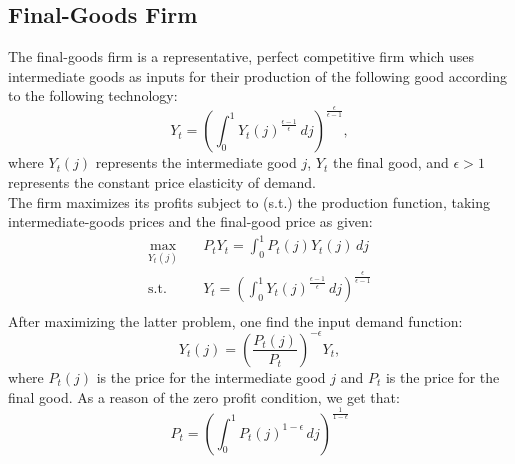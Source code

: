 \documentclass[11pt, a4paper, leqno]{article}
\begin{document}
\subsection{Final-Goods Firm}
The final-goods firm is a representative, perfect competitive firm which uses intermediate goods as inputs for their production of the following good according to the following technology:
\begin{equation}
	Y_{t} = \left( \int_{0}^{1} Y_{t}(j)^{\frac{\epsilon -1}{\epsilon}} \,dj \right)^{\frac{\epsilon}{\epsilon -1}},
\end{equation}
where $Y_{t}(j)$ represents the intermediate good $j$, $Y_{t}$ the final good, and $\epsilon >1$ represents the constant price elasticity of demand.\\
The firm maximizes its profits subject to (s.t.) the production function, taking intermediate-goods prices and the final-good price as given:
\begin{equation*}
	\begin{aligned}
		\max_{Y_{t}(j)} \quad & P_{t}Y_{t} = \int_{0}^{1} P_{t}(j)Y_{t}(j) \,dj\\
		\textrm{s.t.} \quad & Y_{t} = \left( \int_{0}^{1} Y_{t}(j)^{\frac{\epsilon -1}{\epsilon}} \,dj \right)^{\frac{\epsilon}{\epsilon -1}} \\
	\end{aligned}
\end{equation*}
After maximizing the latter problem, one find the input demand function:
\begin{equation}
		Y_{t}(j) = \left( \frac{P_{t}(j)}{P_{t}} \right)^{- \epsilon} Y_{t},
\end{equation}
where $P_{t}(j)$ is the price for the intermediate good $j$ and $P_{t}$ is the price for the final good.
As a reason of the zero profit condition, we get that:
\begin{equation}
		P_{t} = \left( \int_{0}^{1} P_{t}(j)^{1- \epsilon} \,dj \right)^{ \frac{1}{1- \epsilon}}
\end{equation}
\end{document}
